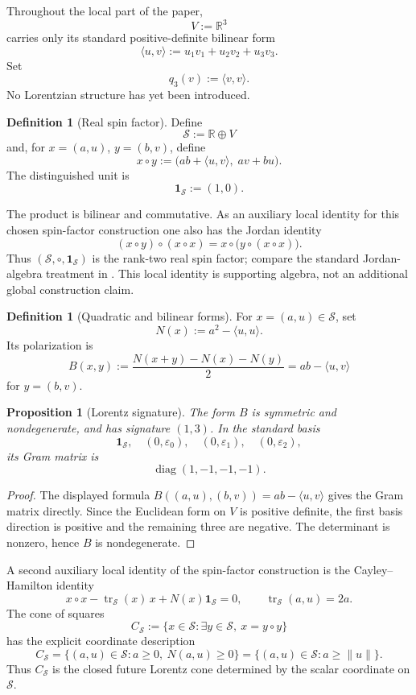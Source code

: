 \documentclass[11pt,a4paper]{article}
\newtheorem{proposition}[theorem]{Proposition}
\theoremstyle{definition}
\newtheorem{definition}[theorem]{Definition}
\theoremstyle{remark}
\newcommand{\R}{\mathbb{R}}
\newcommand{\Smodel}{\mathcal{S}}
\begin{document}
Throughout the local part of the paper,
\[
   V:=\R^{3}
\]
carries only its standard positive-definite bilinear form
\[
   \langle u,v\rangle
   :=u_{1}v_{1}+u_{2}v_{2}+u_{3}v_{3}.
\]
Set
\[
   q_{3}(v):=\langle v,v\rangle.
\]
No Lorentzian structure has yet been introduced.

\begin{definition}[Real spin factor]
\label{def:spin-factor}
Define
\[
   \Smodel:=\R\oplus V
\]
and, for \(x=(a,u)\), \(y=(b,v)\), define
\[
   x\circ y
   :=
   \bigl(ab+\langle u,v\rangle,\; av+bu\bigr).
\]
The distinguished unit is
\[
   \mathbf{1}_{\Smodel}:=(1,0).
\]
\end{definition}

The product is bilinear and commutative.  As an auxiliary local identity
for this chosen spin-factor construction one also has the Jordan identity
\[
   (x\circ y)\circ(x\circ x)
   =
   x\circ\bigl(y\circ(x\circ x)\bigr).
\]
Thus \((\Smodel,\circ,\mathbf{1}_{\Smodel})\) is the rank-two real spin
factor; compare the standard Jordan-algebra treatment in
\cite{JordanNeumannWigner,FarautKoranyi}.  This local identity is supporting
algebra, not an additional global construction claim.

\begin{definition}[Quadratic and bilinear forms]
\label{def:NSBS}
For \(x=(a,u)\in\Smodel\), set
\[
   N(x):=a^{2}-\langle u,u\rangle.
\]
Its polarization is
\[
   B(x,y)
   :=\frac{N(x+y)-N(x)-N(y)}{2}
   =ab-\langle u,v\rangle
\]
for \(y=(b,v)\).
\end{definition}

\begin{proposition}[Lorentz signature]
\label{prop:signature}
The form \(B\) is symmetric and nondegenerate, and has signature \((1,3)\).
In the standard basis
\[
   \mathbf{1}_{\Smodel},\quad
   (0,\varepsilon_{0}),\quad(0,\varepsilon_{1}),\quad(0,\varepsilon_{2}),
\]
its Gram matrix is
\[
   \operatorname{diag}(1,-1,-1,-1).
\]
\end{proposition}

\begin{proof}
The displayed formula
\(B((a,u),(b,v))=ab-\langle u,v\rangle\)
gives the Gram matrix directly.  Since the Euclidean form on \(V\) is
positive definite, the first basis direction is positive and the remaining
three are negative.  The determinant is nonzero, hence \(B\) is
nondegenerate.
\end{proof}

A second auxiliary local identity of the spin-factor construction is the
Cayley--Hamilton identity
\[
   x\circ x-\operatorname{tr}_{\Smodel}(x)\,x
   +N(x)\mathbf{1}_{\Smodel}=0,
   \qquad
   \operatorname{tr}_{\Smodel}(a,u)=2a.
\tag{2.1}
\]
The cone of squares
\[
   C_{\Smodel}:=
   \{x\in\Smodel:\exists y\in\Smodel,\ x=y\circ y\}
\tag{2.2}
\]
has the explicit coordinate description
\[
   C_{\Smodel}
   =\{(a,u)\in\Smodel:a\ge0,\ N(a,u)\ge0\}
   =\{(a,u)\in\Smodel:a\ge\lVert u\rVert\}.
\tag{2.2a}
\]
Thus \(C_{\Smodel}\) is the closed future Lorentz cone determined by the
scalar coordinate on \(\Smodel\).
\end{document}
